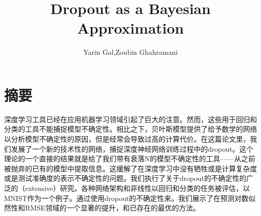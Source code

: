 \documentclass[2pt,a4paper]{article}
\begin{document}
\title{Dropout as a Bayesian Approximation}
\author{Yarin Gal,Zoubin Ghahramani}
\section{摘要}
深度学习工具已经在应用机器学习领域引起了巨大的注意。然而，这些用于回归和分类的工具不能捕捉模型不确定性。相比之下，贝叶斯模型提供了给予数学的网络以分析模型不确定性的原因，但是经常会导致过高的计算代价。在这篇论文里，我们发展了一个新的技术性的网络，捕捉深度神经网络训练过程中的dropout。这个理论的一个直接的结果就是给了我们带有衰落N的模型不确定性的工具——从之前被抛弃的已有的模型中提取信息。这缓解了在深度学习中没有牺牲或是计算复杂度或是测试准确度的表示不确定性的问题。我们执行了关于dropout的不确定性的广泛的（extensive）研究。各种网络架构和非线性以回归和分类的任务被评估，以MNIST作为一个例子。通过使用dropout的不确定性来。我们展示了在预测对数似然性和RMSE领域的一个显著的提升，和已存在的最优的方法。
\end{document}
